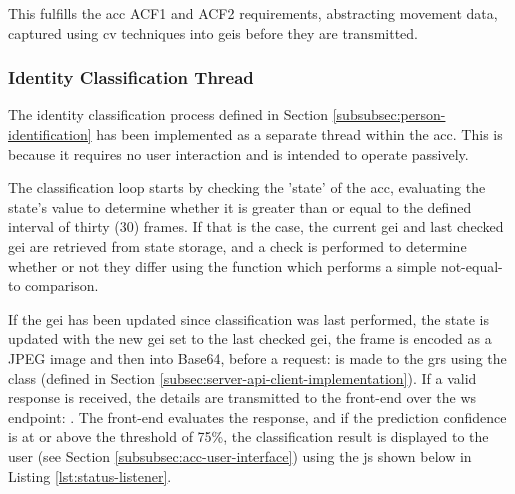 This fulfills the \ac{acc} ACF1 and ACF2 requirements, abstracting movement data, captured using \ac{cv} techniques into \acp{gei} before they are transmitted.

\subsubsection{Identity Classification Thread}
\label{subsubsec:identity-classification-thread}

The identity classification process defined in Section \ref{subsubsec:person-identification} has been implemented as a separate thread within the \ac{acc}. This is because it requires no user interaction and is intended to operate passively.

The classification loop starts by checking the 'state' of the \ac{acc}, evaluating the state's  value to determine whether it is greater than or equal to the defined interval of thirty (30) frames.
If that is the case, the current \ac{gei} and last checked \ac{gei} are retrieved from state storage, and a check is performed to determine whether or not they differ using the  function which performs a simple not-equal-to comparison.

If the \ac{gei} has been updated since classification was last performed, the state is updated with the new \ac{gei} set to the last checked \ac{gei}, the frame is encoded as a JPEG image and then into Base64, before a  request:  is made to the \ac{grs} using the  class (defined in Section \ref{subsec:server-api-client-implementation}).
If a valid response is received, the details are transmitted to the front-end over the  \ac{ws} endpoint: .
The front-end evaluates the response, and if the prediction confidence is at or above the threshold of 75\%, the classification result is displayed to the user (see Section \ref{subsubsec:acc-user-interface}) using the \ac{js} shown below in Listing \ref{lst:status-listener}. 

\label{lst:status-listener} \vspace{10pt}

